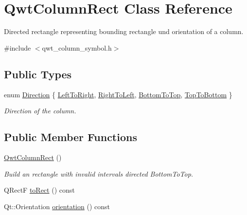 \hypertarget{class_qwt_column_rect}{\section{Qwt\-Column\-Rect Class Reference}
\label{class_qwt_column_rect}
}


Directed rectangle representing bounding rectangle und orientation of a column.  




{\ttfamily \#include $<$qwt\-\_\-column\-\_\-symbol.\-h$>$}

\subsection*{Public Types}
\begin{DoxyCompactItemize}
\item 
enum \hyperlink{class_qwt_column_rect_a70bb2c6f1f8dabe3bc00793740e0908b}{Direction} \{ \hyperlink{class_qwt_column_rect_a70bb2c6f1f8dabe3bc00793740e0908ba3cde7a99f22f5d897ed4b963731256a6}{Left\-To\-Right}, 
\hyperlink{class_qwt_column_rect_a70bb2c6f1f8dabe3bc00793740e0908bac08f1153f84950e62d369cc7b7011b5e}{Right\-To\-Left}, 
\hyperlink{class_qwt_column_rect_a70bb2c6f1f8dabe3bc00793740e0908baa5f0a56f1bd041136476d4ad40ae56f0}{Bottom\-To\-Top}, 
\hyperlink{class_qwt_column_rect_a70bb2c6f1f8dabe3bc00793740e0908ba82a13d6063cc299b78ebe1a90a1f39da}{Top\-To\-Bottom}
 \}
\begin{DoxyCompactList}\small\item\em Direction of the column. \end{DoxyCompactList}\end{DoxyCompactItemize}
\subsection*{Public Member Functions}
\begin{DoxyCompactItemize}
\item 
\hyperlink{class_qwt_column_rect_ad3eeebc150334ee9393d7aff4f33c873}{Qwt\-Column\-Rect} ()
\begin{DoxyCompactList}\small\item\em Build an rectangle with invalid intervals directed Bottom\-To\-Top. \end{DoxyCompactList}\item 
Q\-Rect\-F \hyperlink{class_qwt_column_rect_a0169ba0be3e683ce5c87aacfd172095e}{to\-Rect} () const 
\item 
Qt\-::\-Orientation \hyperlink{class_qwt_column_rect_a8bb5221efc769ef7f474e1f1795de4b6}{orientation} () const 
\end{DoxyCompactItemize}
